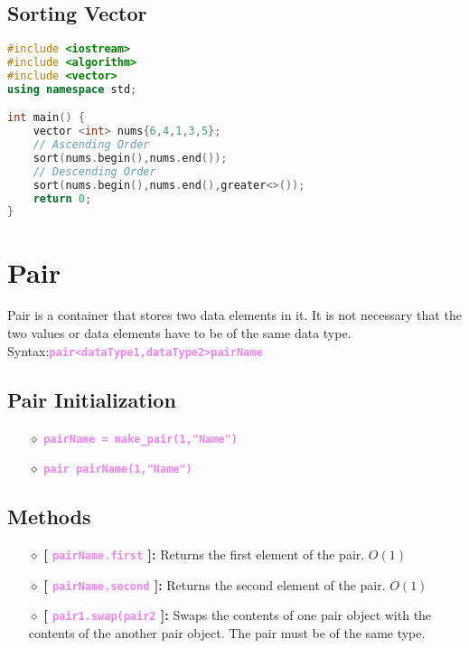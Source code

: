 \newpage
\subsection{Sorting Vector}

\begin{lstlisting}[language=c++]
#include <iostream>
#include <algorithm>
#include <vector>
using namespace std;

int main() {
    vector <int> nums{6,4,1,3,5};
    // Ascending Order
    sort(nums.begin(),nums.end());
    // Descending Order
    sort(nums.begin(),nums.end(),greater<>());   
    return 0;
}

\end{lstlisting}


\newpage
\section{\textbf{Pair}}
Pair is a container that stores two data elements in it. It is not necessary that the two values or data elements have to be of the same data  type.\\
\tab Syntax:\tab \textbf{\textcolor{violet}{\texttt{pair<dataType1,dataType2>pairName}}}

\subsection{Pair Initialization}
\begin{itemize}
	\item[{\LARGE $\diamond$}] \textbf{\textcolor{violet}{\texttt{pairName = make\_pair(1,"Name")}}}
	
	\item[{\LARGE $\diamond$}] \textbf{\textcolor{violet}{\texttt{pair pairName(1,"Name")}}}
\end{itemize}

\subsection{Methods}
\begin{itemize}
	\item[{\LARGE $\diamond$}] \textbf{[ \textcolor{violet}{\texttt{pairName.first}} ]:} Returns the first element of the pair. $O(1)$
	
	\item[{\LARGE $\diamond$}] \textbf{[ \textcolor{violet}{\texttt{pairName.second}} ]:} Returns the second element of the pair. $O(1)$
	
	\item[{\LARGE $\diamond$}]	\textbf{[ \textcolor{violet}{\texttt{pair1.swap(pair2}} ]:} Swaps the contents of one pair object with the contents of the another pair object. The pair must be of the same type.
	
\end{itemize}


